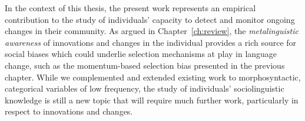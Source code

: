 In the context of this thesis, the present work represents an empirical contribution to the study of individuals' capacity to detect and monitor ongoing changes in their community.
As argued in Chapter~\ref{ch:review}, the \emph{metalinguistic awareness} of innovations and changes in the individual provides a rich source for social biases which could underlie selection mechanisms at play in language change, such as the momentum-based selection bias presented in the previous chapter.
While we complemented and extended existing work to morphosyntactic, categorical variables of low frequency, the study of individuals' sociolinguistic knowledge is still a new topic that will require much further work, particularly in respect to innovations and changes.


